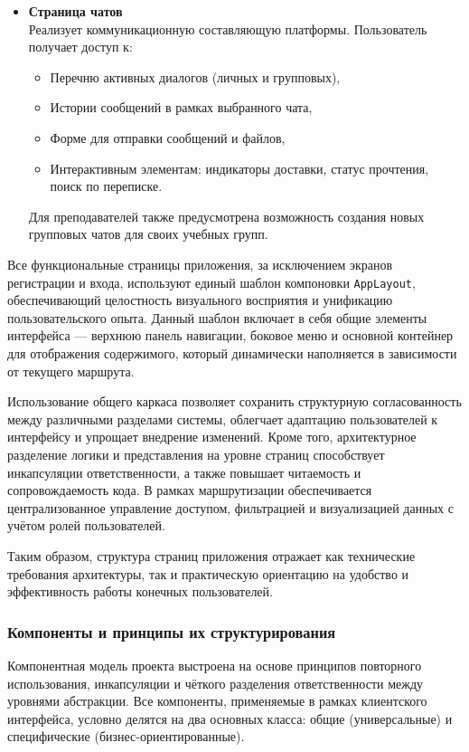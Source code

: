 \begin{itemize}
  \item \textbf{Страница чатов}\\
  Реализует коммуникационную составляющую платформы. Пользователь получает доступ к:
  \begin{itemize}
    \item Перечню активных диалогов (личных и групповых),
    \item Истории сообщений в рамках выбранного чата,
    \item Форме для отправки сообщений и файлов,
    \item Интерактивным элементам: индикаторы доставки, статус прочтения, поиск по переписке.
  \end{itemize}
  Для преподавателей также предусмотрена возможность создания новых групповых чатов для своих учебных групп.
\end{itemize}

Все функциональные страницы приложения, за исключением экранов регистрации и входа, используют единый шаблон компоновки \texttt{AppLayout}, обеспечивающий целостность визуального восприятия и унификацию пользовательского опыта. Данный шаблон включает в себя общие элементы интерфейса — верхнюю панель навигации, боковое меню и основной контейнер для отображения содержимого, который динамически наполняется в зависимости от текущего маршрута. 

Использование общего каркаса позволяет сохранить структурную согласованность между различными разделами системы, облегчает адаптацию пользователей к интерфейсу и упрощает внедрение изменений. Кроме того, архитектурное разделение логики и представления на уровне страниц способствует инкапсуляции ответственности, а также повышает читаемость и сопровождаемость кода. В рамках маршрутизации обеспечивается централизованное управление доступом, фильтрацией и визуализацией данных с учётом ролей пользователей.

Таким образом, структура страниц приложения отражает как технические требования архитектуры, так и практическую ориентацию на удобство и эффективность работы конечных пользователей.

\subsubsection{Компоненты и принципы их структурирования}

Компонентная модель проекта выстроена на основе принципов повторного использования, инкапсуляции и чёткого разделения ответственности между уровнями абстракции. Все компоненты, применяемые в рамках клиентского интерфейса, условно делятся на два основных класса: общие (универсальные) и специфические (бизнес-ориентированные).

